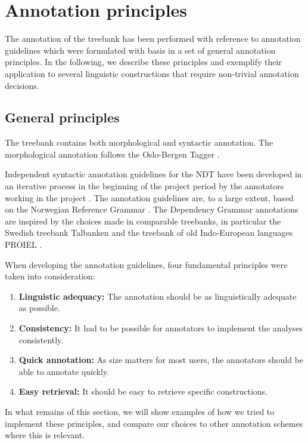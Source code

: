 \documentclass[10pt,a4paper]{article}
\begin{document}

\section{Annotation principles}
The annotation of the treebank has been performed with reference to
annotation guidelines which were formulated with basis in a set of
general annotation principles. In the following, we describe these
principles and exemplify their application to several linguistic
constructions that require non-trivial annotation decisions.
\subsection{General principles}
The treebank contains both morphological and syntactic annotation. The morphological annotation follows the Oslo-Bergen Tagger \cite{Hag:Joh:Nok:00,Sol:2013}.

Independent syntactic annotation guidelines for the NDT have been
developed in an iterative process in the beginning of the project
period by the annotators working in the project
\cite{Kin:Sol:Eri:2013}. The annotation guidelines are, to a large
extent, based on the Norwegian Reference Grammar
\cite{Faa:Lie:Van:97}. The Dependency Grammar annotations are inspired
by the choices made in comparable treebanks, in particular the Swedish
treebank Talbanken \cite{Niv:Nil:Hal:2006} and the treebank of old
Indo-European languages PROIEL \cite{Hau:Joh:Eck:Wel:Her:Mut:2009}.

When developing the annotation guidelines, four fundamental principles were taken into consideration:
\begin{enumerate}
 \item \textbf{Linguistic adequacy:} The annotation should be as linguistically adequate as possible.
 \item \textbf{Consistency:} It had to be possible for annotators to implement the analyses consistently.
 \item \textbf{Quick annotation:} As size matters for most users, the annotators should be able to annotate quickly.
 \item \textbf{Easy retrieval:} It should be easy to retrieve specific constructions.
\end{enumerate}
In what remains of this section, we will show examples of how we tried to implement these principles, and compare our choices to other annotation schemes where this is relevant.
\end{document}
